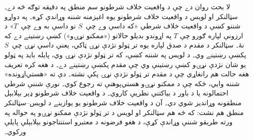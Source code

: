 \documentclass[../../../include/open-logic-section]{subfiles}
\begin{document}
لا بحث روان دے چې د واقعيت خلاف شرطونو سم منطق په دقيقه توګه
څه دے۔ سټالنکر او لويس د واقعيت خلاف شرطونو يوه اغېزمنه شننه
وړاندې کړه۔ په دواړو شننو کښې د واقعيت خلاف شرطي «که داسې
وے چې~$S$ نو داسې به وے چې~$T$» د ارزونې لپاره ګورو چې $T$ په
اړوندو بديلو حالاتو («ممکنو نړۍو») کښې رښتينے دے که نۀ۔
سټالنکر د مقدم د صدق لپاره يوه تر ټولو نژدې نړۍ ټاکي، يعنې
داسې نړۍ چې~$S$ پکښې رښتينے وي۔ د لويس په شننه کښې، که تر
ټولو نژدې نړۍ وي، پايله بايد په ټولو يو شان نژدې نړۍو کښې
رښتينې وي چې مقدم پکښې رښتينے دے۔ د هغه کره تعريف
هغه حالت هم رانغاړي چې د مقدم تر ټولو نژدې نړۍ پکې نشته۔
دې ته «هستي‌اړونده» شننه وايي، ځکه چې د ممکنو نړۍو هستي‌پوهنې
ته رجوع کوي۔ نورې شننې شرطي احتمالونه يا د باور د بياکتنې
نظريې کاروي۔ د واقعيت خلاف شرطونو ډېر بېلابېل منطقونه وړانديز
شوي دي۔ آن د واقعيت خلاف شرطونو يو يوازينے د لويس--سټالنکر
منطق هم نشت: که څه هم سټالنکر او لويس د تر ټولو نژدې ممکنو
نړۍو په حواله په ورته طريقو شننې وړاندې کړې، د هغو فرضونه د
معتبرو استنتاجونو بېلابېلې پايلې ورکوي۔
\end{document}
